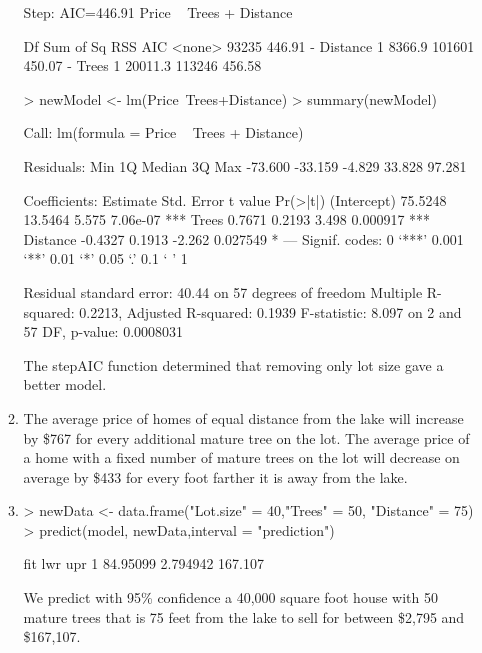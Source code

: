 \documentclass[]{article}
\begin{document}
\begin{enumerate}
\begin{enumerate}
\begin{Schunk}
\begin{Soutput}
Step:  AIC=446.91
Price ~ Trees + Distance

           Df Sum of Sq    RSS    AIC
<none>                   93235 446.91
- Distance  1    8366.9 101601 450.07
- Trees     1   20011.3 113246 456.58
\end{Soutput}
\begin{Sinput}
> newModel <- lm(Price~Trees+Distance)
> summary(newModel)         
\end{Sinput}
\begin{Soutput}
Call:
lm(formula = Price ~ Trees + Distance)

Residuals:
    Min      1Q  Median      3Q     Max 
-73.600 -33.159  -4.829  33.828  97.281 

Coefficients:
            Estimate Std. Error t value Pr(>|t|)    
(Intercept)  75.5248    13.5464   5.575 7.06e-07 ***
Trees         0.7671     0.2193   3.498 0.000917 ***
Distance     -0.4327     0.1913  -2.262 0.027549 *  
---
Signif. codes:  0 ‘***’ 0.001 ‘**’ 0.01 ‘*’ 0.05 ‘.’ 0.1 ‘ ’ 1

Residual standard error: 40.44 on 57 degrees of freedom
Multiple R-squared:  0.2213,	Adjusted R-squared:  0.1939 
F-statistic: 8.097 on 2 and 57 DF,  p-value: 0.0008031
\end{Soutput}
\end{Schunk}

The stepAIC function determined that removing only lot size gave a better model. 

\item

The average price of homes of equal distance from the lake will increase by \$767 for every additional mature tree on the lot. The average price of a home with a fixed number of mature trees on the lot will decrease on average by \$433 for every foot farther it is away from the lake.

\item

\begin{Schunk}
\begin{Sinput}
> newData <- data.frame("Lot.size" = 40,"Trees" = 50, "Distance" = 75)
> predict(model, newData,interval = "prediction")
\end{Sinput}
\begin{Soutput}
       fit      lwr     upr
1 84.95099 2.794942 167.107
\end{Soutput}
\end{Schunk}

We predict with 95\% confidence a 40,000 square foot house with 50 mature trees that is 75 feet from the lake to sell for between \$2,795 and \$167,107.


\end{enumerate}
\end{enumerate}
\end{document}
